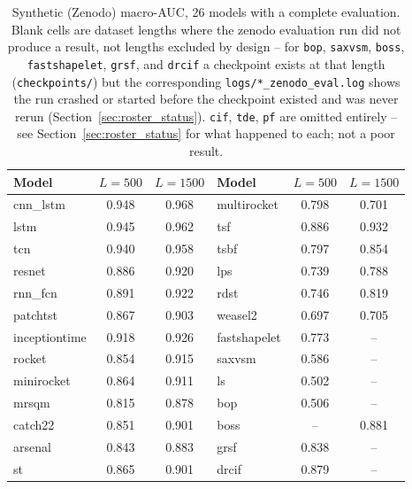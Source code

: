 \begin{table}[htbp]
\centering
\small
\caption{Synthetic (Zenodo) macro-AUC, 26 models with a complete evaluation. Blank cells are dataset lengths where the zenodo evaluation run did not produce a result, not lengths excluded by design -- for \texttt{bop}, \texttt{saxvsm}, \texttt{boss}, \texttt{fastshapelet}, \texttt{grsf}, and \texttt{drcif} a checkpoint exists at that length (\texttt{checkpoints/}) but the corresponding \texttt{logs/*\_zenodo\_eval.log} shows the run crashed or started before the checkpoint existed and was never rerun (Section~\ref{sec:roster_status}). \texttt{cif}, \texttt{tde}, \texttt{pf} are omitted entirely -- see Section~\ref{sec:roster_status} for what happened to each; not a poor result.}
\label{tab:zenodo_results}
\begin{tabular}{lcc|lcc}
\toprule
Model & $L{=}500$ & $L{=}1500$ & Model & $L{=}500$ & $L{=}1500$ \\
\midrule
cnn\_lstm & 0.948 & 0.968 & multirocket & 0.798 & 0.701 \\
lstm & 0.945 & 0.962 & tsf & 0.886 & 0.932 \\
tcn & 0.940 & 0.958 & tsbf & 0.797 & 0.854 \\
resnet & 0.886 & 0.920 & lps & 0.739 & 0.788 \\
rnn\_fcn & 0.891 & 0.922 & rdst & 0.746 & 0.819 \\
patchtst & 0.867 & 0.903 & weasel2 & 0.697 & 0.705 \\
inceptiontime & 0.918 & 0.926 & fastshapelet & 0.773 & -- \\
rocket & 0.854 & 0.915 & saxvsm & 0.586 & -- \\
minirocket & 0.864 & 0.911 & ls & 0.502 & -- \\
mrsqm & 0.815 & 0.878 & bop & 0.506 & -- \\
catch22 & 0.851 & 0.901 & boss & -- & 0.881 \\
arsenal & 0.843 & 0.883 & grsf & 0.838 & -- \\
st & 0.865 & 0.901 & drcif & 0.879 & -- \\
\bottomrule
\end{tabular}
\end{table}


